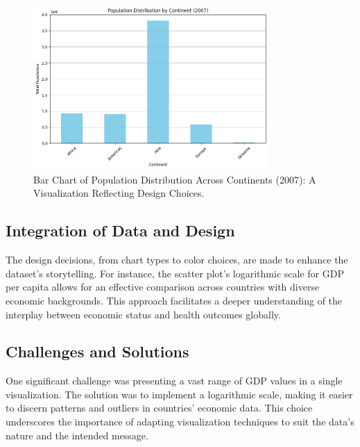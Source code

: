 \begin{figure}[h]
    \centering
    \includegraphics[width=0.8\textwidth]{images/plots/lo3_barplot.png} 
    \caption{Bar Chart of Population Distribution Across Continents (2007): A Visualization Reflecting Design Choices.}
    \label{fig:lo3_barchart}
\end{figure}

\subsection{Integration of Data and Design}
The design decisions, from chart types to color choices, are made to enhance the dataset's storytelling. For instance, the scatter plot’s logarithmic scale for GDP per capita allows for an effective comparison across countries with diverse economic backgrounds. This approach facilitates a deeper understanding of the interplay between economic status and health outcomes globally.

\subsection{Challenges and Solutions}
One significant challenge was presenting a vast range of GDP values in a single visualization. The solution was to implement a logarithmic scale, making it easier to discern patterns and outliers in countries' economic data. This choice underscores the importance of adapting visualization techniques to suit the data's nature and the intended message.